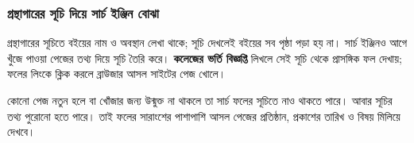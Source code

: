 \subsubsection{গ্রন্থাগারের সূচি দিয়ে সার্চ ইঞ্জিন বোঝা}
গ্রন্থাগারের সূচিতে বইয়ের নাম ও অবস্থান লেখা থাকে; সূচি দেখলেই বইয়ের সব পৃষ্ঠা পড়া হয় না। সার্চ ইঞ্জিনও আগে খুঁজে পাওয়া পেজের তথ্য দিয়ে সূচি তৈরি করে। \textbf{কলেজের ভর্তি বিজ্ঞপ্তি} লিখলে সেই সূচি থেকে প্রাসঙ্গিক ফল দেখায়; ফলের লিংকে ক্লিক করলে ব্রাউজার আসল সাইটের পেজ খোলে।

কোনো পেজ নতুন হলে বা খোঁজার জন্য উন্মুক্ত না থাকলে তা সার্চ ফলের সূচিতে নাও থাকতে পারে। আবার সূচির তথ্য পুরোনো হতে পারে। তাই ফলের সারাংশের পাশাপাশি আসল পেজের প্রতিষ্ঠান, প্রকাশের তারিখ ও বিষয় মিলিয়ে দেখবে।
